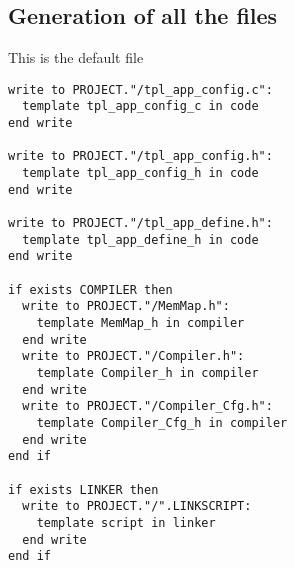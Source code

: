 \subsection{Generation of all the files}

This is the default  file

\begin{lstlisting}[frame=single]
write to PROJECT."/tpl_app_config.c":
  template tpl_app_config_c in code
end write

write to PROJECT."/tpl_app_config.h":
  template tpl_app_config_h in code
end write

write to PROJECT."/tpl_app_define.h":
  template tpl_app_define_h in code
end write

if exists COMPILER then
  write to PROJECT."/MemMap.h":
    template MemMap_h in compiler
  end write
  write to PROJECT."/Compiler.h":
    template Compiler_h in compiler
  end write
  write to PROJECT."/Compiler_Cfg.h":
    template Compiler_Cfg_h in compiler
  end write
end if

if exists LINKER then
  write to PROJECT."/".LINKSCRIPT:
    template script in linker
  end write
end if
\end{lstlisting}
